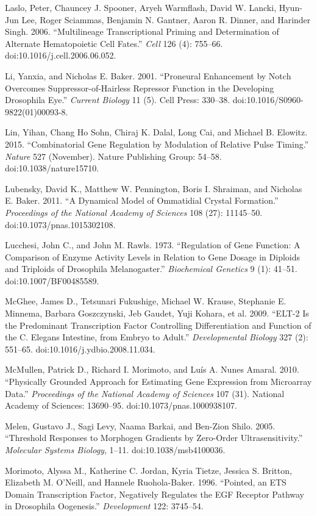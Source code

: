 Laslo, Peter, Chauncey J. Spooner, Aryeh Warmflash, David W. Lancki, Hyun-Jun Lee, Roger Sciammas, Benjamin N. Gantner, Aaron R. Dinner, and Harinder Singh. 2006. ``Multilineage Transcriptional Priming and Determination of Alternate Hematopoietic Cell Fates.'' \emph{Cell} 126 (4): 755--66. doi:10.1016/j.cell.2006.06.052.

Li, Yanxia, and Nicholas E. Baker. 2001. ``Proneural Enhancement by Notch Overcomes Suppressor-of-Hairless Repressor Function in the Developing Drosophila Eye.'' \emph{Current Biology} 11 (5). Cell Press: 330--38. doi:10.1016/S0960-9822(01)00093-8.

Lin, Yihan, Chang Ho Sohn, Chiraj K. Dalal, Long Cai, and Michael B. Elowitz. 2015. ``Combinatorial Gene Regulation by Modulation of Relative Pulse Timing.'' \emph{Nature} 527 (November). Nature Publishing Group: 54--58. doi:10.1038/nature15710.

Lubensky, David K., Matthew W. Pennington, Boris I. Shraiman, and Nicholas E. Baker. 2011. ``A Dynamical Model of Ommatidial Crystal Formation.'' \emph{Proceedings of the National Academy of Sciences} 108 (27): 11145--50. doi:10.1073/pnas.1015302108.

Lucchesi, John C., and John M. Rawls. 1973. ``Regulation of Gene Function: A Comparison of Enzyme Activity Levels in Relation to Gene Dosage in Diploids and Triploids of Drosophila Melanogaster.'' \emph{Biochemical Genetics} 9 (1): 41--51. doi:10.1007/BF00485589.

McGhee, James D., Tetsunari Fukushige, Michael W. Krause, Stephanie E. Minnema, Barbara Goszczynski, Jeb Gaudet, Yuji Kohara, et al. 2009. ``ELT-2 Is the Predominant Transcription Factor Controlling Differentiation and Function of the C. Elegans Intestine, from Embryo to Adult.'' \emph{Developmental Biology} 327 (2): 551--65. doi:10.1016/j.ydbio.2008.11.034.

McMullen, Patrick D., Richard I. Morimoto, and Luís A. Nunes Amaral. 2010. ``Physically Grounded Approach for Estimating Gene Expression from Microarray Data.'' \emph{Proceedings of the National Academy of Sciences} 107 (31). National Academy of Sciences: 13690--95. doi:10.1073/pnas.1000938107.

Melen, Gustavo J., Sagi Levy, Naama Barkai, and Ben-Zion Shilo. 2005. ``Threshold Responses to Morphogen Gradients by Zero-Order Ultrasensitivity.'' \emph{Molecular Systems Biology}, 1--11. doi:10.1038/msb4100036.

Morimoto, Alyssa M., Katherine C. Jordan, Kyria Tietze, Jessica S. Britton, Elizabeth M. O'Neill, and Hannele Ruohola-Baker. 1996. ``Pointed, an ETS Domain Transcription Factor, Negatively Regulates the EGF Receptor Pathway in Drosophila Oogenesis.'' \emph{Development} 122: 3745--54.

